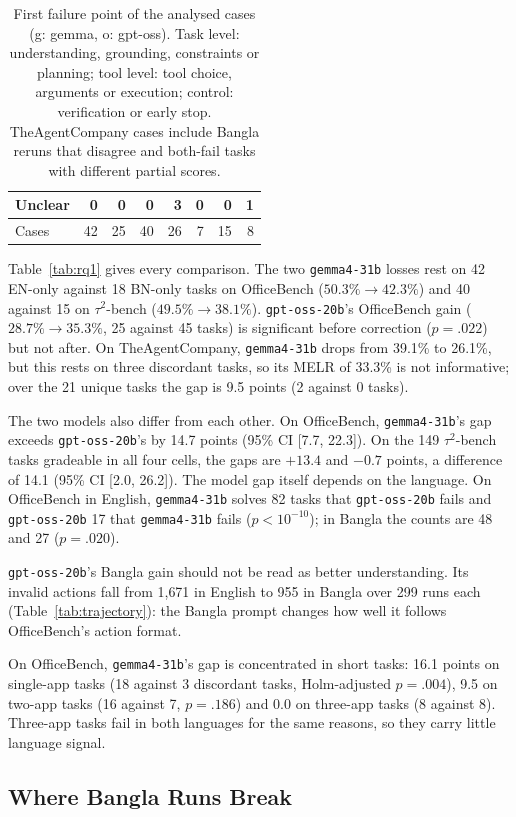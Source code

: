 \documentclass[11pt]{article}
\newcommand{\gemma}{\texttt{gemma4-31b}}
\newcommand{\gptoss}{\texttt{gpt-oss-20b}}
\newcommand{\OB}{OfficeBench}
\newcommand{\TAU}{$\tau^2$-bench}
\newcommand{\TAC}{TheAgentCompany}
\begin{document}
\begin{table}[t]
\begin{minipage}[t]{0.395\textwidth}
\begin{tabular}{lrrrrrrr}
Unclear                                 & 0  & 0  & 0  & 3  & 0 & 0  & 1 \\
\midrule
Cases                                   & 42 & 25 & 40 & 26 & 7 & 15 & 8 \\
\bottomrule
\end{tabular}
\caption{First failure point of the analysed cases (g: gemma, o: gpt-oss). Task level:
understanding, grounding, constraints or planning; tool level: tool choice, arguments or execution;
control: verification or early stop. \TAC{} cases include Bangla reruns that disagree and both-fail
tasks with different partial scores.}
\label{tab:rq2}
\end{minipage}
\end{table}

Table~\ref{tab:rq1} gives every comparison. The two \gemma{} losses rest on 42 EN-only against
18 BN-only tasks on \OB{} ($50.3\%\to42.3\%$) and 40 against 15 on \TAU{} ($49.5\%\to38.1\%$).
\gptoss{}'s \OB{} gain ($28.7\%\to35.3\%$, 25 against 45 tasks) is significant before correction
($p=.022$) but not after. On \TAC{}, \gemma{} drops from 39.1\% to 26.1\%,
but this rests on three discordant tasks, so its MELR of 33.3\% is not informative; over the 21
unique tasks the gap is 9.5 points (2 against 0 tasks).

The two models also differ from each other. On \OB{}, \gemma{}'s gap exceeds \gptoss{}'s by
14.7 points (95\% CI [7.7, 22.3]). On the 149 \TAU{} tasks gradeable in all four cells, the gaps
are $+13.4$ and $-0.7$ points, a difference of 14.1 (95\% CI [2.0, 26.2]). The model gap itself
depends on the language. On \OB{} in English, \gemma{} solves 82 tasks that \gptoss{} fails and
\gptoss{} 17 that \gemma{} fails ($p<10^{-10}$); in Bangla the counts are 48 and 27 ($p=.020$).

\gptoss{}'s Bangla gain should not be read as better understanding. Its invalid actions fall
from 1{,}671 in English to 955 in Bangla over 299 runs each (Table~\ref{tab:trajectory}): the
Bangla prompt changes how well it follows \OB{}'s action format.

On \OB{}, \gemma{}'s gap is concentrated in short tasks: 16.1 points on single-app tasks (18
against 3 discordant tasks, Holm-adjusted $p=.004$), 9.5 on two-app tasks (16 against 7,
$p=.186$) and 0.0 on three-app tasks (8 against 8). Three-app tasks fail in both languages for
the same reasons, so they carry little language signal.

\subsection{Where Bangla Runs Break}
\label{sec:rq2}
\end{document}
